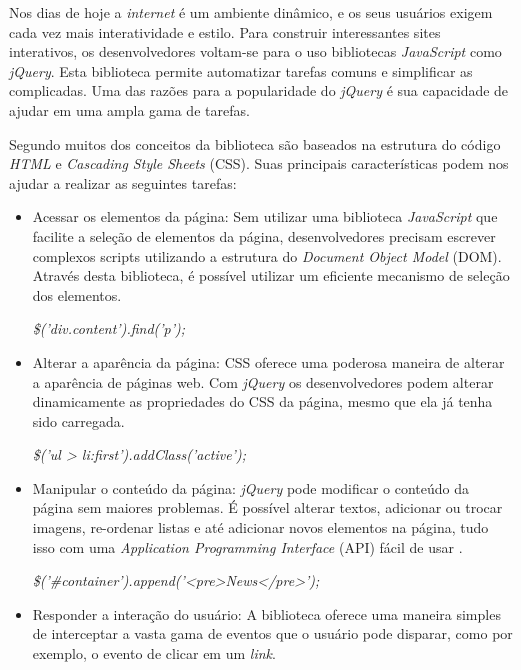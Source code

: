 Nos dias de hoje a \textit{internet} é um ambiente dinâmico, e os seus usuários exigem cada vez mais interatividade e estilo. Para construir interessantes sites interativos, os desenvolvedores voltam-se para o uso bibliotecas \textit{JavaScript} como \textit{jQuery}. Esta biblioteca permite automatizar tarefas comuns e simplificar as complicadas. Uma das razões para a popularidade do \textit{jQuery} é sua capacidade de ajudar em uma ampla gama de tarefas.

Segundo  muitos dos conceitos da biblioteca são baseados na estrutura do código \textit{HTML} e \textit{Cascading Style Sheets} (CSS). Suas principais características podem nos ajudar a realizar as seguintes tarefas:

\begin{itemize}
\item Acessar os elementos da página: Sem utilizar uma biblioteca \textit{JavaScript} que facilite a seleção de elementos da página, desenvolvedores precisam escrever complexos scripts utilizando a estrutura do \textit{Document Object Model} (DOM). Através desta biblioteca, é possível utilizar um eficiente mecanismo de seleção dos elementos.

\begin{center}
\textit{\$('div.content').find('p');}
\end{center}

\item Alterar a aparência da página: CSS oferece uma poderosa maneira de alterar a aparência de páginas web. Com \textit{jQuery} os desenvolvedores podem alterar dinamicamente as propriedades do CSS da página, mesmo que ela já tenha sido carregada.

\begin{center}
\textit{\$('ul > li:first').addClass('active');}
\end{center}

\item Manipular o conteúdo da página: \textit{jQuery} pode modificar o conteúdo da página sem maiores problemas. É possível alterar textos, adicionar ou trocar imagens, re-ordenar listas e até adicionar novos elementos na página, tudo isso com uma \textit{Application Programming Interface} (API) fácil de usar \cite{JQUERY-API}.

\begin{center}
\textit{\$('\#container').append('<pre>News</pre>');}
\end{center}

\item Responder a interação do usuário: A biblioteca oferece uma maneira simples de interceptar a vasta gama de eventos que o usuário pode disparar, como por exemplo, o evento de clicar em um \textit{link}.


\end{itemize}
